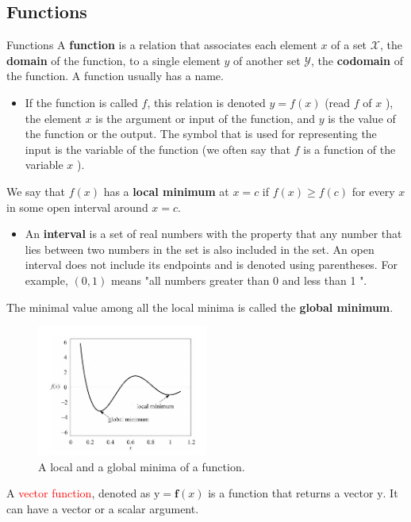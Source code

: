 \documentclass[9pt,dvipsnames]{beamer}
\begin{document}
\subsection{Functions}
\begin{frame}{Functions}
	A \textbf{function} is a relation that associates each element $x$ of a set $\mathcal{X}$, the \textbf{domain} of the function, to a single element $y$ of another set $\mathcal{Y}$, the \textbf{codomain} of the function. A function usually has a name.
	\begin{itemize}
		\item 	If the function is called $f$, this relation is denoted $y=f(x)$ (read $f$ of $x$ ), the element $x$ is the argument or input of the function, and $y$ is the value of the function or the output. The symbol that is used for representing the input is the variable of the function (we often say that $f$ is a function of the variable $x$ ).
	\end{itemize}
\end{frame}

\begin{frame}
	We say that $f(x)$ has a \textbf{local minimum} at $x=c$ if $f(x) \geq f(c)$ for every $x$ in some open interval around $x=c$.
	\begin{itemize}
		\item An \textbf{interval} is a set of real numbers with the property that any number that lies between two numbers in the set is also included in the set. An open interval does not include its endpoints and is denoted using parentheses. For example, $(0,1)$ means "all numbers greater than 0 and less than 1 ".
	\end{itemize}
	The minimal value among all the local minima is called the \textbf{global minimum}.
	\begin{figure}
		\centering
		\includegraphics[width=0.5\textwidth]{imgs/notation_2}
		\caption{A local and a global minima of a function.}
	\end{figure}
	A \textcolor{red}{vector function}, denoted as $\mathrm{y}=\boldsymbol{f}(x)$ is a function that returns a vector $\mathrm{y}$. It can have a vector or a scalar argument.
\end{frame}
\end{document}
